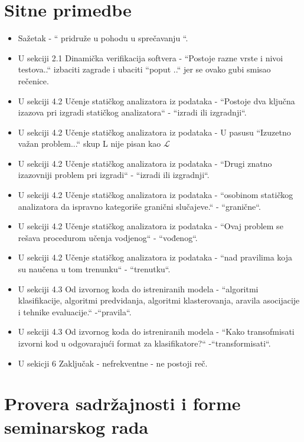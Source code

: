 \documentclass[a4paper]{report}
\begin{document}
\section{Sitne primedbe}
\begin{itemize}
   \item Sažetak - `` pridruže u pohodu u sprečavanju ``.
   \item U sekciji 2.1 Dinamička verifikacija softvera - ``Postoje razne vrste i nivoi testova..`` izbaciti zagrade i ubaciti ``poput ..`` jer se ovako gubi smisao rečenice.
   \item U sekciji 4.2 Učenje statičkog analizatora iz podataka - ``Postoje dva ključna izazova pri izgradi statičkog analizatora`` - ``izradi ili izgradnji``.
   \item U sekciji 4.2 Učenje statičkog analizatora iz podataka - U pasusu ``Izuzetno važan problem...`` skup L nije pisan kao $\mathcal{L}$
   \item U sekciji 4.2 Učenje statičkog analizatora iz podataka - ``Drugi znatno izazovniji problem pri izgradi`` - ``izradi ili izgradnji``.
   \item U sekciji 4.2 Učenje statičkog analizatora iz podataka - ``osobinom statičkog analizatora da ispravno kategoriše granični slučajeve.`` - ``granične``.
   \item U sekciji 4.2 Učenje statičkog analizatora iz podataka - ``Ovaj problem se rešava procedurom učenja vodjenog`` - ``vođenog``.
   \item U sekciji 4.2 Učenje statičkog analizatora iz podataka - ``nad pravilima koja su naučena u tom trenunku`` - ``trenutku``.
   \item U sekciji 4.3 Od izvornog koda do istreniranih modela - ``algoritmi klasifikacije, algoritmi predvidanja, algoritmi klasterovanja, aravila asocijacije i tehnike evaluacije.`` -``pravila``.
   \item U sekciji 4.3 Od izvornog koda do istreniranih modela - ``Kako transofmisati izvorni kod u odgovarajući format za klasifikatore?`` -``transformisati``. 	
   \item U sekicji 6 Zaključak - nefrekventne - ne postoji reč.
\end{itemize}


\section{Provera sadržajnosti i forme seminarskog rada}
\end{document}
